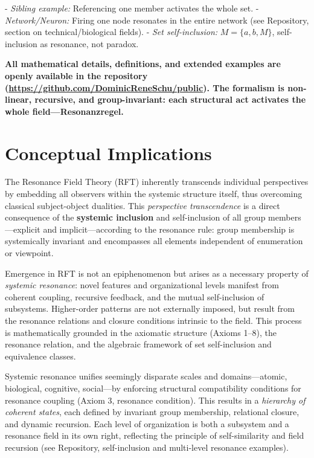 \documentclass[12pt]{article}
\begin{document}
- \textit{Sibling example:} Referencing one member activates the whole set.
- \textit{Network/Neuron:} Firing one node resonates in the entire network (see Repository, section on technical/biological fields).
- \textit{Set self-inclusion:} $M = \{a, b, M\}$, self-inclusion as resonance, not paradox.

\medskip

\textbf{All mathematical details, definitions, and extended examples are openly available in the repository (\url{https://github.com/DominicReneSchu/public}). The formalism is non-linear, recursive, and group-invariant: each structural act activates the whole field—Resonanzregel.}

	
	\section{Conceptual Implications}
	
	The Resonance Field Theory (RFT) inherently transcends individual perspectives by embedding all observers within the systemic structure itself, thus overcoming classical subject-object dualities. This \textit{perspective transcendence} is a direct consequence of the \textbf{systemic inclusion} and self-inclusion of all group members—explicit and implicit—according to the resonance rule: group membership is systemically invariant and encompasses all elements independent of enumeration or viewpoint.
	
	Emergence in RFT is not an epiphenomenon but arises as a necessary property of \textit{systemic resonance}: novel features and organizational levels manifest from coherent coupling, recursive feedback, and the mutual self-inclusion of subsystems. Higher-order patterns are not externally imposed, but result from the resonance relations and closure conditions intrinsic to the field. This process is mathematically grounded in the axiomatic structure (Axioms 1–8), the resonance relation, and the algebraic framework of set self-inclusion and equivalence classes.
	
	Systemic resonance unifies seemingly disparate scales and domains—atomic, biological, cognitive, social—by enforcing structural compatibility conditions for resonance coupling (Axiom 3, resonance condition). This results in a \textit{hierarchy of coherent states}, each defined by invariant group membership, relational closure, and dynamic recursion. Each level of organization is both a subsystem and a resonance field in its own right, reflecting the principle of self-similarity and field recursion (see Repository, self-inclusion and multi-level resonance examples).
	
\end{document}
